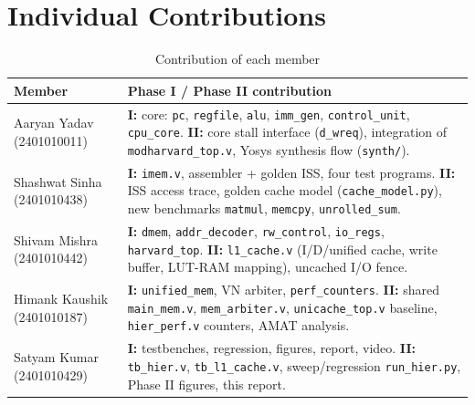\documentclass[conference]{IEEEtran}
\begin{document}
\section{Individual Contributions}
\begin{table}[h]
\caption{Contribution of each member}
\label{tab:contrib}
\centering
\renewcommand{\arraystretch}{1.15}
\begin{tabular}{p{}p{}}
\toprule
Member & Phase I / Phase II contribution \\
\midrule
Aaryan Yadav (2401010011) & \textbf{I:} core: \texttt{pc}, \texttt{regfile}, \texttt{alu}, \texttt{imm\_gen}, \texttt{control\_unit}, \texttt{cpu\_core}. \textbf{II:} core stall interface (\texttt{d\_wreq}), integration of \texttt{modharvard\_top.v}, Yosys synthesis flow (\texttt{synth/}). \\
Shashwat Sinha (2401010438) & \textbf{I:} \texttt{imem.v}, assembler + golden ISS, four test programs. \textbf{II:} ISS access trace, golden cache model (\texttt{cache\_model.py}), new benchmarks \texttt{matmul}, \texttt{memcpy}, \texttt{unrolled\_sum}. \\
Shivam Mishra (2401010442) & \textbf{I:} \texttt{dmem}, \texttt{addr\_decoder}, \texttt{rw\_control}, \texttt{io\_regs}, \texttt{harvard\_top}. \textbf{II:} \texttt{l1\_cache.v} (I/D/unified cache, write buffer, LUT-RAM mapping), uncached I/O fence. \\
Himank Kaushik (2401010187) & \textbf{I:} \texttt{unified\_mem}, VN arbiter, \texttt{perf\_counters}. \textbf{II:} shared \texttt{main\_mem.v}, \texttt{mem\_arbiter.v}, \texttt{unicache\_top.v} baseline, \texttt{hier\_perf.v} counters, AMAT analysis. \\
Satyam Kumar (2401010429) & \textbf{I:} testbenches, regression, figures, report, video. \textbf{II:} \texttt{tb\_hier.v}, \texttt{tb\_l1\_cache.v}, sweep/regression \texttt{run\_hier.py}, Phase II figures, this report. \\
\bottomrule
\end{tabular}
\end{table}

\end{document}
